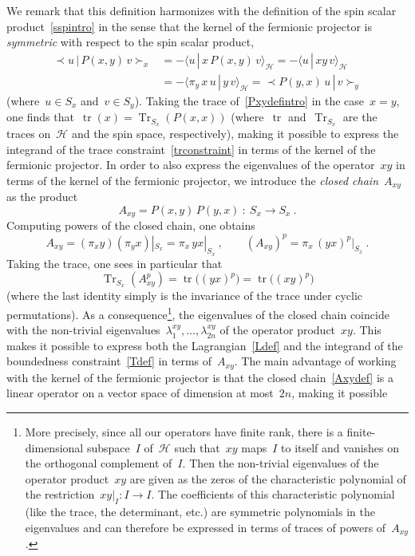 \documentclass[reqno,11pt]{amsart}
\numberwithin{equation}{section}
\newcommand{\beq}{\begin{equation}}
\newcommand{\eeq}{\end{equation}}
\newcommand{\la}{\langle}
\newcommand{\ra}{\rangle}
\newcommand{\Sl}{\mathopen{\prec}}
\newcommand{\Sr}{\mathclose{\succ}}
\newcommand{\1}{\mbox{\rm 1 \hspace{-1.05 em} 1}}
\renewcommand{\H}{\mathscr{H}}
\DeclareMathOperator{\Tr}{Tr}
\DeclareMathOperator{\tr}{tr}
\begin{document}
We remark that this definition harmonizes with the definition of the
spin scalar product~\eqref{sspintro} in the sense that the kernel of the fermionic projector
is {\em{symmetric}} with respect to the spin scalar product,
\begin{align*}
\Sl u \,|\, P(x,y) \,v \Sr_x &= - \la u \,|\, x\, P(x,y) \,v \ra_\H = - \la u \,|\, x y \,v \ra_\H \\
&= -\la \pi_y \,x\, u \,|\, y \,v \ra_\H = \Sl P(y,x)\, u \,|\,  v \Sr_y
\end{align*}
(where~$u \in S_x$ and~$v \in S_y$).
Taking the trace of~\eqref{Pxydefintro} in the case~$x=y$, one
finds that~$\tr(x) = \Tr_{S_x}(P(x,x))$
(where~$\tr$ and~$\Tr_{S_x}$ are the traces on~$\H$ and the spin space, respectively),
making it possible to express
the integrand of the trace constraint~\eqref{trconstraint} in terms of the kernel of the fermionic projector.
In order to also express the eigenvalues of the operator~$xy$ in terms of the kernel of the fermionic projector,
we introduce the {\em{closed chain}}~$A_{xy}$ as the product
\beq \label{Axydef}
A_{xy} = P(x,y)\, P(y,x) \::\: S_x \rightarrow S_x\:.
\eeq
Computing powers of the closed chain, one obtains
\[ A_{xy} = (\pi_x y)(\pi_y x)|_{S_x} = \pi_x\, yx|_{S_x} \:,\qquad
(A_{xy})^p = \pi_x\, (yx)^p|_{S_x} \:. \]
Taking the trace, one sees in particular that
\[ %
\Tr_{S_x}(A_{xy}^p) = \tr \big((yx)^p \big) = \tr \big((xy)^p \big) \]
(where the last identity simply is the invariance of the trace under cyclic permutations).
As a consequence\footnote{More precisely, since all our operators have finite rank, there is a finite-dimensional subspace~$I$
of~$\H$ such that~$xy$ maps~$I$ to itself and vanishes on the orthogonal complement of~$I$.
Then the non-trivial eigenvalues of the operator product~$xy$ are given
as the zeros of the characteristic polynomial of the restriction~$xy|_I : I \rightarrow I$.
The coefficients of this characteristic polynomial (like the trace, the determinant, etc.)
are symmetric polynomials in the eigenvalues and can therefore be expressed in terms of traces of
powers of~$A_{xy}$.}, the eigenvalues of the closed chain coincide with the non-trivial
eigenvalues~$\lambda^{xy}_1, \ldots, \lambda^{xy}_{2n}$ of the operator product~$xy$.
This makes it possible to express both the Lagrangian~\eqref{Ldef}
and the integrand of the boundedness constraint~\eqref{Tdef} in terms of~$A_{xy}$.
The main advantage of working with the kernel of the fermionic projector is that the closed chain~\eqref{Axydef}
is a linear operator on a vector space of dimension at most~$2n$, making it possible
\end{document}
